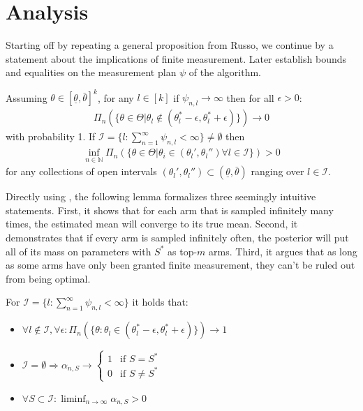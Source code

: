 \section{Analysis}\label{section:analysis}
Starting off by repeating a general proposition from Russo, we continue by a statement about the implications of finite measurement. Later establish bounds and equalities on the measurement plan $\psi$ of the
algorithm.

\begin{proposition}\label{proposition:russo_4}
  Assuming $\theta \in [\underline{\theta}, \bar{\theta}]^k$, for any $l \in
      [k]$ if $\psi_{n, l} \rightarrow \infty$ then for all $\epsilon > 0$:
  \begin{align}
    \Pi_n(\{\theta \in \Theta | \theta_l \notin (\theta_l^* - \epsilon,
        \theta_l^* + \epsilon)\}) \rightarrow 0
  \end{align}
  with probability 1. If $\mathcal{I} = \{l: \sum_{n=1}^\infty \psi_{n, l} <
  \infty\} \neq \emptyset$ then
  \begin{align}
    \inf_{n \in \mathbb{N}} \Pi_n(\{\theta \in \Theta | \theta_i \in
        (\theta_l', \theta_l'') \forall l \in \mathcal{I}\}) > 0
  \end{align}
  for any collections of open intervals $(\theta_l', \theta_l'') \subset
  (\underline{\theta}, \bar{\theta})$ ranging over $l \in \mathcal{I}$.
\end{proposition}
Directly using , the following lemma formalizes three
seemingly intuitive statements. First, it shows that for each arm that is
sampled infinitely many times, the estimated mean will converge to its true
mean. Second, it demonstrates that if every arm is sampled infinitely often, the
posterior will put all of its mass on parameters with $S^*$ as top-$m$ arms.
Third, it argues that as long as some arms have only been granted finite
measurement, they can't be ruled out from being optimal.
\begin{lemma}\label{lemma:finite_measurement}
  For $\mathcal{I} = \{l: \sum_{n=1}^\infty \psi_{n, l} < \infty\}$ it holds
      that:
  \begin{itemize}
    \item $\forall l \notin \mathcal{I}, \forall \epsilon: \Pi_n(\{\theta:
        \theta_l \in (\theta^*_l - \epsilon, \theta^*_l + \epsilon)\})
        \rightarrow 1$
    \item $\mathcal{I} = \emptyset \Rightarrow
    \alpha_{n, S} \rightarrow \begin{cases}
      1 & \text{if } S = S^*\\
      0 & \text{if } S \neq S^*
    \end{cases}$
    \item $\forall S \subset \mathcal{I}: \liminf_{n \rightarrow \infty}
        \alpha_{n, S} > 0$
  \end{itemize}
\end{lemma}
